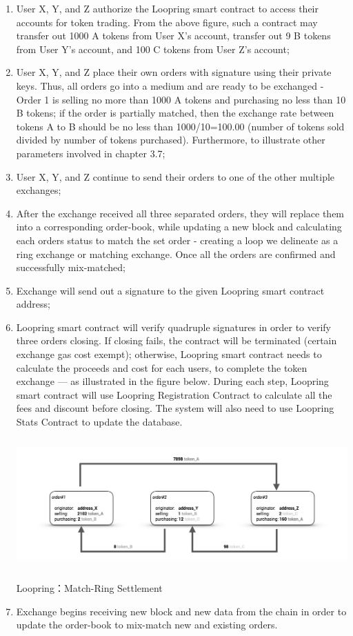 \documentclass[UTF8,nofonts]{article}
\makeatletter
\newenvironment{figurehere}
 {\def\@captype{figure}}
 {}
\makeatother
\begin{document}
\begin{enumerate}
 \item User X, Y, and Z authorize the Loopring smart contract to access their accounts for token trading. From the above figure, such a contract may transfer out 1000 A tokens from User X's account, transfer out 9 B tokens from User Y's account, and 100 C tokens from User Z's account;
 \item User X, Y, and Z place their own orders with signature using their private keys. Thus, all orders go into a medium and are ready to be exchanged - Order 1 is selling no more than 1000 A tokens and purchasing no less than 10 B tokens; if the order is partially matched,  then the exchange rate between tokens A to B should be no less than 1000/10=100.00 (number of tokens sold divided by number of tokens purchased). Furthermore, to illustrate other parameters involved in chapter 3.7;
 \item User X, Y, and Z continue to send their orders to one of the other multiple exchanges;
 \item After the exchange received all three separated orders, they will replace them into a corresponding order-book, while updating a new block and calculating each orders status to match the set order - creating a loop we delineate as a ring exchange or matching exchange. Once all the orders are confirmed and successfully mix-matched;
 \item Exchange will send out a signature to the given Loopring smart contract address;
 \item Loopring smart contract will verify quadruple signatures in order to verify three orders closing. If closing fails, the contract will be terminated (certain exchange gas cost exempt); otherwise, Loopring smart contract needs to calculate the proceeds and cost for each users, to complete the token exchange --- as illustrated in the figure below. During each step, Loopring smart contract will use Loopring Registration Contract to calculate all the fees and discount before closing. The system will also need to use Loopring Stats Contract to update the database.

\begin{center}
\begin{figurehere}
\includegraphics[height=5cm]{images/en-Loopring-example.png}
\caption{Loopring：Match-Ring Settlement}
\label{fig:Loopringprotocol}
\end{figurehere}
\end{center}
  
  
 \item Exchange begins receiving new block and new data from the chain in order to update the order-book to mix-match new and existing orders.
\end{enumerate}
\end{document}
